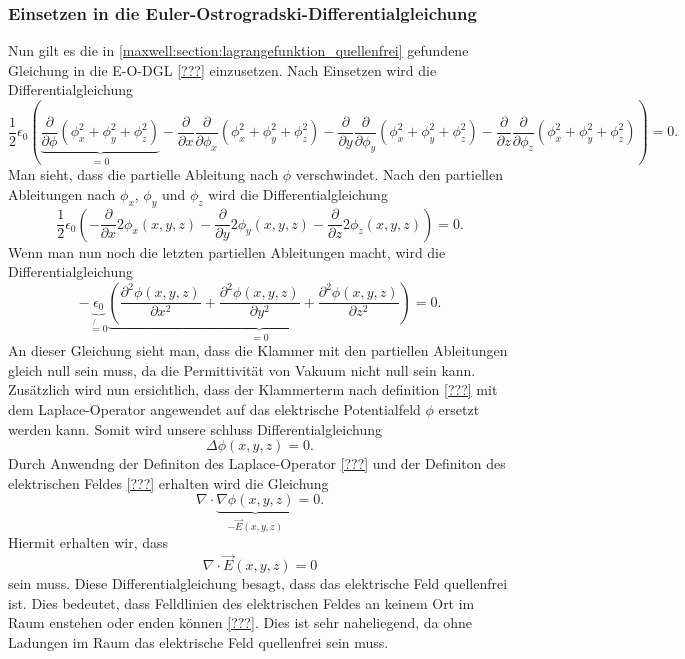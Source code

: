 \subsubsection{Einsetzen in die Euler-Ostrogradski-Differentialgleichung}
Nun gilt es die in \eqref{maxwell:section:lagrangefunktion_quellenfrei} gefundene Gleichung in die E-O-DGL \ref{???} einzusetzen.
Nach Einsetzen wird die Differentialgleichung
\[
\frac{1}{2}\epsilon_0\left(\underbrace{\frac{\partial}{\partial\phi}\left(\phi_x^2 + \phi_y^2 + \phi_z^2\right)}_{=0} - \frac{\partial}{\partial x}\frac{\partial}{\partial \phi_x}\left(\phi_x^2 + \phi_y^2 + \phi_z^2\right) - 
\frac{\partial}{\partial y}\frac{\partial}{\partial \phi_y}\left(\phi_x^2 + \phi_y^2 + \phi_z^2\right) - 
\frac{\partial}{\partial z}\frac{\partial}{\partial \phi_z}\left(\phi_x^2 + \phi_y^2 + \phi_z^2\right)\right)
=
0.
\]
Man sieht, dass die partielle Ableitung nach $\phi$ verschwindet.
Nach den partiellen Ableitungen nach $\phi_x$, $\phi_y$ und $\phi_z$ wird die Differentialgleichung
\[
\frac{1}{2}\epsilon_0\left(-\frac{\partial}{\partial x}2\phi_x(x,y,z) - \frac{\partial}{\partial y}2\phi_y(x,y,z) - \frac{\partial}{\partial z}2\phi_z(x,y,z)\right)
=
0.
\]
Wenn man nun noch die letzten partiellen Ableitungen macht, wird die Differentialgleichung
\begin{equation}
	- \underbrace{\epsilon_0}_{\not{=}0}\underbrace{\left(\frac{\partial^2\phi(x,y,z)}{\partial x^2} + \frac{\partial^2\phi(x,y,z)}{\partial y^2} + \frac{\partial^2\phi(x,y,z)}{\partial z^2}\right)}_{=0}
	=
	0.
	\label{maxwell:section:laplace_gleichung_1}
\end{equation}
An dieser Gleichung sieht man, dass die Klammer mit den partiellen Ableitungen gleich null sein muss, da die Permittivität von Vakuum nicht null sein kann.
Zusätzlich wird nun ersichtlich, dass der Klammerterm nach definition \ref{???} mit dem Laplace-Operator angewendet auf das elektrische Potentialfeld $\phi$ ersetzt werden kann.
Somit wird unsere schluss Differentialgleichung
\begin{equation}
	\Delta\phi(x,y,z)
	=
	0.
	\label{maxwell:section:laplace_gleichung_2}
\end{equation}
Durch Anwendng der Definiton des Laplace-Operator \ref{???} und der Definiton des elektrischen Feldes \ref{???} erhalten wird die Gleichung
\[
\nabla\cdot\underbrace{\nabla\phi(x,y,z)}_{-\vec{E}(x,y,z)}
=
0.
\]
Hiermit erhalten wir, dass
\begin{equation}
	\nabla\cdot\vec{E}(x,y,z)
	=
	0
	\label{maxwell:section:e_feld_quellenfrei}
\end{equation}
sein muss. Diese Differentialgleichung besagt, dass das elektrische Feld quellenfrei ist.
Dies bedeutet, dass Felldlinien des elektrischen Feldes an keinem Ort im Raum enstehen oder enden können \ref{???}.
Dies ist sehr naheliegend, da ohne Ladungen im Raum das elektrische Feld quellenfrei sein muss.

